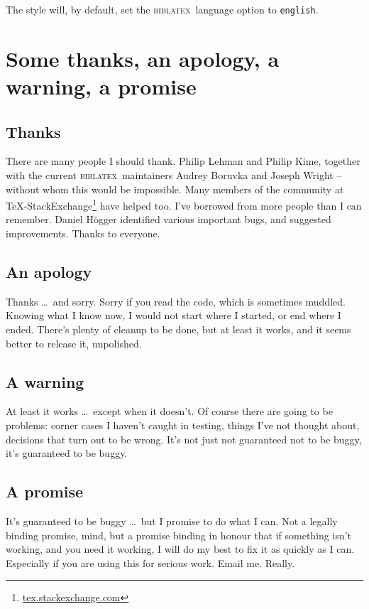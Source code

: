 \documentclass[a5paper,fontsize=9pt,DIV=1]{scrartcl}
\newcommand{\biblatex}{\textsc{biblatex}}
\begin{document}
The style will, by default, set the \biblatex\ language option to
\texttt{english}.

\section{Some thanks, an apology, a warning, a promise}

\subsection{Thanks}

There are many people I should thank. Philip Lehman and Philip Kime,
together with the current \biblatex\ maintainers Audrey Boruvka and
Joseph Wright -- without whom this would be impossible. Many members
of the community at
\TeX-StackExchange\footnote{\url{tex.stackexchange.com}} have helped
too. I've borrowed from more people than I can remember. Daniel
H\"ogger identified various important bugs, and suggested
improvements. Thanks to everyone.

\subsection{An apology}

Thanks \ldots\ and sorry. Sorry if you read the code, which is
sometimes muddled. Knowing what I know now, I would not start where I
started, or end where I ended. There's plenty of cleanup to be done,
but at least it works, and it seems better to release it, unpolished.

\subsection{A warning}

At least it works \ldots\ except when it doesn't. Of course there are
going to be problems: corner cases I haven't caught in testing, things
I've not thought about, decisions that turn out to be wrong. It's not
just not guaranteed not to be buggy, it's guaranteed to be
buggy.

\subsection{A promise}

It's guaranteed to be buggy \ldots\ but I promise to do what I
can. Not a legally binding promise, mind, but a promise binding in
honour that if something isn't working, and you need it working, I
will do my best to fix it as quickly as I can. Especially if you are
using this for serious work. Email
me. Really.
\end{document}
